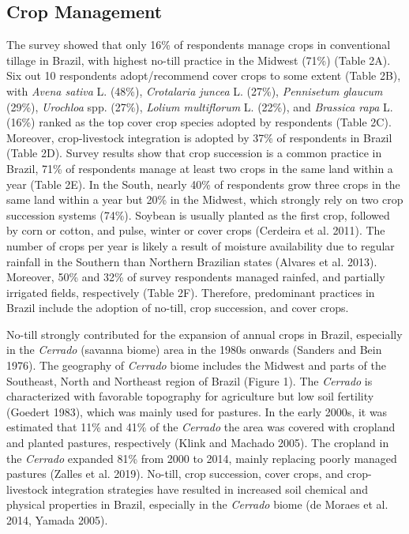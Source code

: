 \documentclass[
  12pt,
  a4paper]{article}
\begin{document}
\hypertarget{crop-management}{%
\subsection{Crop Management}\label{crop-management}}

The survey showed that only 16\% of respondents manage crops in
conventional tillage in Brazil, with highest no-till practice in the
Midwest (71\%) (Table 2A). Six out 10 respondents adopt/recommend cover
crops to some extent (Table 2B), with \emph{Avena sativa} L. (48\%),
\emph{Crotalaria juncea} L. (27\%), \emph{Pennisetum glaucum} (29\%),
\emph{Urochloa} spp. (27\%), \emph{Lolium multiflorum} L. (22\%), and
\emph{Brassica rapa} L. (16\%) ranked as the top cover crop species
adopted by respondents (Table 2C). Moreover, crop-livestock integration
is adopted by 37\% of respondents in Brazil (Table 2D). Survey results
show that crop succession is a common practice in Brazil, 71\% of
respondents manage at least two crops in the same land within a year
(Table 2E). In the South, nearly 40\% of respondents grow three crops in
the same land within a year but 20\% in the Midwest, which strongly rely
on two crop succession systems (74\%). Soybean is usually planted as the
first crop, followed by corn or cotton, and pulse, winter or cover crops
(Cerdeira et al. 2011). The number of crops per year is likely a result
of moisture availability due to regular rainfall in the Southern than
Northern Brazilian states (Alvares et al. 2013). Moreover, 50\% and 32\%
of survey respondents managed rainfed, and partially irrigated fields,
respectively (Table 2F). Therefore, predominant practices in Brazil
include the adoption of no-till, crop succession, and cover crops.

No-till strongly contributed for the expansion of annual crops in
Brazil, especially in the \emph{Cerrado} (savanna biome) area in the
1980s onwards (Sanders and Bein 1976). The geography of \emph{Cerrado}
biome includes the Midwest and parts of the Southeast, North and
Northeast region of Brazil (Figure 1). The \emph{Cerrado} is
characterized with favorable topography for agriculture but low soil
fertility (Goedert 1983), which was mainly used for pastures. In the
early 2000s, it was estimated that 11\% and 41\% of the \emph{Cerrado}
the area was covered with cropland and planted pastures, respectively
(Klink and Machado 2005). The cropland in the \emph{Cerrado} expanded
81\% from 2000 to 2014, mainly replacing poorly managed pastures (Zalles
et al. 2019). No-till, crop succession, cover crops, and crop-livestock
integration strategies have resulted in increased soil chemical and
physical properties in Brazil, especially in the \emph{Cerrado} biome
(de Moraes et al. 2014, Yamada 2005).
\end{document}
